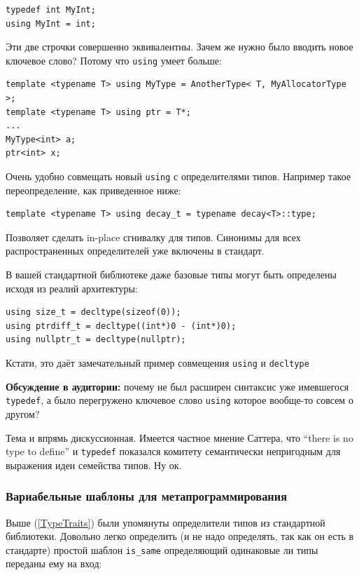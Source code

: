 \documentclass[a4paper,12pt,oneside]{article}
\begin{document}
\begin{lstlisting}
typedef int MyInt;
using MyInt = int;
\end{lstlisting}

Эти две строчки совершенно эквивалентны. Зачем же нужно было вводить новое ключевое слово? Потому что \lstinline!using! умеет больше:

\begin{lstlisting}
template <typename T> using MyType = AnotherType< T, MyAllocatorType >; 
template <typename T> using ptr = T*;
...
MyType<int> a;
ptr<int> x;
\end{lstlisting}

Очень удобно совмещать новый \lstinline!using! с определителями типов. Например такое переопределение, как приведенное ниже:

\begin{lstlisting}
template <typename T> using decay_t = typename decay<T>::type;
\end{lstlisting}

Позволяет сделать in-place сгнивалку для типов. Синонимы для всех распространенных определителей уже включены в стандарт.

В вашей стандартной библиотеке даже базовые типы могут быть определены исходя из реалий архитектуры:

\begin{lstlisting}
using size_t = decltype(sizeof(0));
using ptrdiff_t = decltype((int*)0 - (int*)0);
using nullptr_t = decltype(nullptr);
\end{lstlisting}

Кстати, это даёт замечательный пример совмещения \lstinline!using! и \lstinline!decltype!

\textbf{Обсуждение в аудитории:} почему не был расширен синтаксис уже имевшегося \lstinline!typedef!, а было перегружено ключевое слово \lstinline!using! которое вообще-то совсем о другом?

Тема и впрямь дискуссионная. Имеется частное мнение Саттера, что ``there is no type to define'' и \lstinline!typedef! показался комитету семантически непригодным для выражения идеи семейства типов. Ну ок.

\subsubsection{Вариабельные шаблоны для метапрограммирования}

Выше (\ref{TypeTraits}) были упомянуты определители типов из стандартной библиотеки. Довольно легко определить (и не надо определять, так как он есть в стандарте) простой шаблон \lstinline!is_same! определяющий одинаковые ли типы переданы ему на вход:
\end{document}

